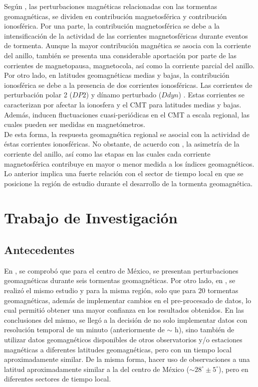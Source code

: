 \documentclass[preprint,12pt]{article}
\begin{document}
Según \cite{ddyn2005}, las perturbaciones magnéticas relacionadas con las tormentas geomagnéticas, se dividen en contribución magnetosférica y contribución ionosférica. Por una parte, la contribución magnetosférica se debe a la intensificación de la actividad de las corrientes magnetosféricas durante eventos de tormenta. Aunque la mayor contribución magnética se asocia con la corriente del anillo, también se presenta una considerable aportación por parte de las corrientes de magnetopausa, magnetocola, así como la corriente parcial del anillo.\\

Por otro lado, en latitudes geomagnéticas medias y bajas, la contribución ionosférica se debe a la presencia de dos corrientes ionosféricas. Las corrientes de perturbación polar 2 ($DP2$) \cite{nishida_68_fluctuations} y dínamo perturbado ($Ddyn$) \cite{blanc_ddyn}. Estas corrientes se caracterizan por afectar la ionosfera y el CMT para latitudes medias y bajas. Además, inducen fluctuaciones cuasi-periódicas  en el CMT a escala regional, las cuales pueden ser medidas en magnetómetros.\\

De esta forma, la respuesta geomagnética regional se asocial con la actividad de éstas corrientes ionosféricas. No obstante, de acuerdo con \cite{partialringcurrentidx, partialringcurrentasym}, la asimetría de la corriente del anillo, así como las etapas en las cuales cada corriente magnetosférica contribuye en mayor o menor medida a los índices geomagnéticos. Lo anterior implica una fuerte relación con el sector de tiempo local en que se posicione la región de estudio durante el desarrollo de la tormenta geomagnética.

\section{Trabajo de Investigación}
\label{S:2}

\subsection{Antecedentes}
En \cite{tesis}, se comprobó que para el centro de México, se presentan perturbaciones geomagnéticas durante seis tormentas geomagnéticas. Por otro lado, en \cite{CASTELLANOSVELAZCO2024106237}, se realizó el mismo estudio y para la misma región, solo que para 20 tormentas geomagnéticas, además de implementar cambios en el pre-procesado de datos, lo cual permitió obtener una mayor confianza en los resultados obtenidos. En las conclusiones del mismo, se llegó a la decisión de no solo implementar datos con resolución temporal de un minuto (anteriormente de $\sim$ h), sino también de utilizar datos geomagnéticos disponibles de otros observatorios y/o estaciones magnéticas a diferentes latitudes geomagnéticas, pero con un tiempo local aproximadamente similar. De la misma forma, hacer uso de observaciones a una latitud aproximadamente similar a la del centro de México ($\sim 28^\circ \pm 5^\circ$), pero en diferentes sectores de tiempo local.\\
\end{document}
